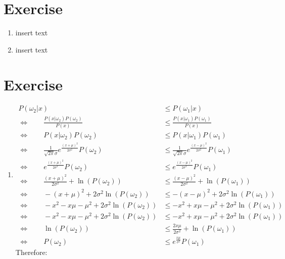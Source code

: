 \documentclass[a4paper]{article}
\begin{document}
	\section{Exercise}
		\begin{enumerate}[label={(\alph*)}]
			\item insert text
			\item insert text
		\end{enumerate}
	\section{Exercise}
	
		\begin{enumerate}[label={(\alph*)}]
		\item
			\begin{align*}
			P(\omega_2|x) &\leq P(\omega_1|x)\\
			\Leftrightarrow \qquad \frac{P(x|\omega_2)P(\omega_2)}{P(x)} &\leq \frac{P(x|\omega_1)P(\omega_1)}{P(x)}\\
			\Leftrightarrow \qquad P(x|\omega_2)P(\omega_2)&\leq P(x|\omega_1)P(\omega_1)\\
			\Leftrightarrow \qquad \frac{1}{\sqrt{2\pi}\sigma}e^{ \displaystyle\frac{(x+\mu)^2}{2\sigma^2}}P(\omega_2) &\leq \frac{1}{\sqrt{2\pi}\sigma}e^{\displaystyle \frac{(x-\mu)^2}{2\sigma^2}}P(\omega_1)\\
			\Leftrightarrow \qquad e^{\displaystyle\frac{(x+\mu)^2}{2\sigma^2}}P(\omega_2) &\leq e^{\displaystyle \frac{(x-\mu)^2}{2\sigma^2}}P(\omega_1)\\
			\Leftrightarrow \qquad \frac{(x+\mu)^2}{2\sigma^2} + \ln(P(\omega_2)) &\leq \frac{(x-\mu)^2}{2\sigma^2} + \ln(P(\omega_1))\\
			\Leftrightarrow \qquad -(x+\mu)^2 + 2\sigma^2\ln(P(\omega_2)) &\leq -(x-\mu)^2 + 2\sigma^2\ln(P(\omega_1))\\
			\Leftrightarrow \qquad -x^2 -x\mu -\mu^2 + 2\sigma^2\ln(P(\omega_2)) &\leq -x^2+x\mu -\mu^2 + 2\sigma^2\ln(P(\omega_1))\\
			\Leftrightarrow \qquad -x^2 -x\mu -\mu^2 + 2\sigma^2\ln(P(\omega_2)) &\leq -x^2+x\mu -\mu^2 + 2\sigma^2\ln(P(\omega_1))\\
			\Leftrightarrow \qquad \ln(P(\omega_2)) &\leq \frac{2x\mu}{2\sigma^2}+\ln(P(\omega_1))\\
			\Leftrightarrow \qquad P(\omega_2) &\leq e^{\displaystyle \frac{x\mu}{\sigma^2}}P(\omega_1)
			\end{align*}
			Therefore:\\

\end{enumerate}
\end{document}

